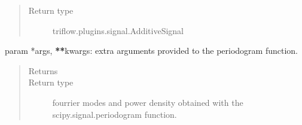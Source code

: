 \documentclass[letterpaper,10pt,english]{sphinxmanual}
\begin{document}
\begin{fulllineitems}
\begin{fulllineitems}
\begin{quote}
\begin{description}
\item[{Return type}] \leavevmode
triflow.plugins.signal.AdditiveSignal

\end{description}\end{quote}

\end{fulllineitems}


\begin{fulllineitems}
\label{\detokenize{triflow.plugins:triflow.plugins.signals.Signal.fourrier_spectrum}}
param *args, {\color{red}\bfseries{}**}kwargs: extra arguments provided to the periodogram function.
\begin{quote}\begin{description}
\item[{Returns}] \leavevmode
{}

\item[{Return type}] \leavevmode
fourrier modes and power density obtained with the scipy.signal.periodogram function.

\end{description}\end{quote}

\end{fulllineitems}


\end{fulllineitems}

\end{document}
